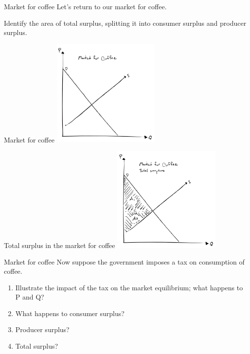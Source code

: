 \documentclass[aspectratio=169]{beamer}
\begin{document}
\begin{frame}{Market for coffee}
    Let's return to our market for coffee.

    \vspace{5mm}

    Identify the area of total surplus, splitting it into consumer surplus and producer surplus.
\end{frame}

\begin{frame}{Market for coffee}
    \centering
    \includegraphics[width = 0.4\textwidth,keepaspectratio]{coffee1.png}
\end{frame}

\begin{frame}{Total surplus in the market for coffee}
    \centering
    \includegraphics[width = 0.4\textwidth,keepaspectratio]{coffee2.png}
\end{frame}

\begin{frame}{Market for coffee}
    Now suppose the government imposes a tax on consumption of coffee.

    \vspace{2mm}

    \begin{enumerate}
        \item Illustrate the impact of the tax on the market equilibrium; what happens to P and Q?
        \item What happens to consumer surplus?
        \item Producer surplus?
        \item Total surplus?
    \end{enumerate}
\end{frame}
\end{document}
